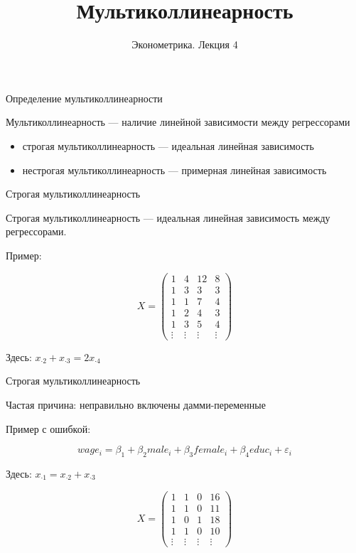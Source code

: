 \documentclass[russian,ignorenonframetext,]{beamer}
\author[Эконометрика. Лекция 4]{Эконометрика. Лекция 4}
\title{Мультиколлинеарность}
\date{}
\providecommand{\tightlist}{%
  \setlength{\itemsep}{0pt}\setlength{\parskip}{0pt}}
\begin{document}
\frame{\titlepage}

\begin{frame}{Определение мультиколлинеарности}

Мультиколлинеарность --- наличие линейной зависимости между регрессорами

\begin{itemize}
\tightlist
\item
  строгая мультиколлинеарность --- идеальная линейная зависимость
\item
  нестрогая мультиколлинеарность --- примерная линейная зависимость
\end{itemize}

\end{frame}

\begin{frame}{Строгая мультиколлинеарность}

Строгая мультиколлинеарность --- идеальная линейная зависимость между
регрессорами.

Пример:

\[
X=\begin{pmatrix}
1 & 4 & 12 & 8 \\ 
1 & 3 & 3 & 3 \\ 
1 & 1 & 7 & 4 \\ 
1 & 2 & 4 & 3 \\
1 & 3 & 5 & 4 \\
\vdots & \vdots & \vdots & \vdots
\end{pmatrix} 
\]

Здесь: \(x_{\cdot 2}+x_{\cdot 3}=2x_{\cdot 4}\)

\end{frame}

\begin{frame}{Строгая мультиколлинеарность}

Частая причина: неправильно включены дамми-переменные

Пример с ошибкой:

\[
wage_i=\beta_1 + \beta_2 male_i + \beta_3 female_i + \beta_4 educ_i + \varepsilon_i
\]

Здесь: \(x_{\cdot 1}=x_{\cdot 2}+x_{\cdot 3}\)

\[
X=\begin{pmatrix}
1 & 1 & 0 & 16 \\ 
1 & 1 & 0 & 11 \\ 
1 & 0 & 1 & 18 \\ 
1 & 1 & 0 & 10 \\ 
\vdots & \vdots & \vdots & \vdots
\end{pmatrix} 
\]

\end{frame}
\end{document}
